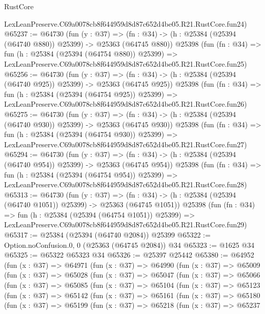 \begin{lexlean}{RustCore}
\begin{coremodule}
    LexLeanPreserve.C69a0078cb8f644959d8d87c652d4be05.R21.RustCore.fun24)
@65237 := @64730
    (fun (y : @37) =>
    (fn : @34) -> (h : @25384 (@25394 (@64740 @880)) @25399) -> @25363 (@64745 @880))
    @25398
    (fun (fn : @34) =>
    fun (h : @25384 (@25394 (@64754 @880)) @25399) =>
    LexLeanPreserve.C69a0078cb8f644959d8d87c652d4be05.R21.RustCore.fun25)
@65256 := @64730
    (fun (y : @37) =>
    (fn : @34) -> (h : @25384 (@25394 (@64740 @925)) @25399) -> @25363 (@64745 @925))
    @25398
    (fun (fn : @34) =>
    fun (h : @25384 (@25394 (@64754 @925)) @25399) =>
    LexLeanPreserve.C69a0078cb8f644959d8d87c652d4be05.R21.RustCore.fun26)
@65275 := @64730
    (fun (y : @37) =>
    (fn : @34) -> (h : @25384 (@25394 (@64740 @930)) @25399) -> @25363 (@64745 @930))
    @25398
    (fun (fn : @34) =>
    fun (h : @25384 (@25394 (@64754 @930)) @25399) =>
    LexLeanPreserve.C69a0078cb8f644959d8d87c652d4be05.R21.RustCore.fun27)
@65294 := @64730
    (fun (y : @37) =>
    (fn : @34) -> (h : @25384 (@25394 (@64740 @954)) @25399) -> @25363 (@64745 @954))
    @25398
    (fun (fn : @34) =>
    fun (h : @25384 (@25394 (@64754 @954)) @25399) =>
    LexLeanPreserve.C69a0078cb8f644959d8d87c652d4be05.R21.RustCore.fun28)
@65313 := @64730
    (fun (y : @37) =>
    (fn : @34) -> (h : @25384 (@25394 (@64740 @1051)) @25399) -> @25363 (@64745 @1051))
    @25398
    (fun (fn : @34) =>
    fun (h : @25384 (@25394 (@64754 @1051)) @25399) =>
    LexLeanPreserve.C69a0078cb8f644959d8d87c652d4be05.R21.RustCore.fun29)
@65317 := @25384 (@25394 (@64740 @2084)) @25399
@65322 := Option.noConfusion.{0, 0} (@25363 (@64745 @2084)) @34
@65323 := @1625 @34
@65325 := @65322 @65323 @34
@65326 := @25397 @25442
@65380 := @64952
    (fun (x : @37) =>
    @64971
      (fun (x : @37) =>
      @64990
        (fun (x : @37) =>
        @65009
          (fun (x : @37) =>
          @65028
            (fun (x : @37) =>
            @65047
              (fun (x : @37) =>
              @65066
                (fun (x : @37) =>
                @65085
                  (fun (x : @37) =>
                  @65104
                    (fun (x : @37) =>
                    @65123
                      (fun (x : @37) =>
                      @65142
                        (fun (x : @37) =>
                        @65161
                          (fun (x : @37) =>
                          @65180
                            (fun (x : @37) =>
                            @65199
                              (fun (x : @37) =>
                              @65218
                                (fun (x : @37) =>
                                @65237

\end{coremodule}
\end{lexlean}
